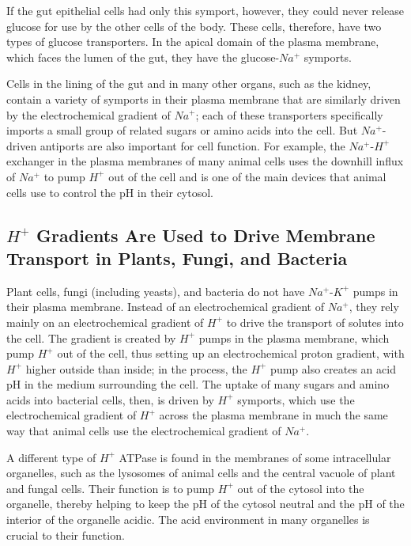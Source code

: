 If the gut epithelial cells had only this symport, however, they could never
release glucose for use by the other cells of the body. These cells, therefore,
have two types of glucose transporters. In the apical domain of the plasma
membrane, which faces the lumen of the gut, they have the glucose-$Na^{+}$
symports.

Cells in the lining of the gut and in many other organs, such as the kidney,
contain a variety of symports in their plasma membrane that are similarly
driven by the electrochemical gradient of $Na^{+}$; each of these transporters
specifically imports a small group of related sugars or amino acids into
the cell. But $Na^{+}$-driven antiports are also important for cell function. For
example, the $Na^{+}$-$H^{+}$ exchanger in the plasma membranes of many animal
cells uses the downhill influx of $Na^{+}$ to pump $H^{+}$ out of the cell and
is one of the main devices that animal cells use to control the pH in their
cytosol.

\subsection{$H^{+}$ Gradients Are Used to Drive Membrane Transport in Plants, Fungi, and Bacteria}

Plant cells, fungi (including yeasts), and bacteria do not have $Na^{+}$-$K^{+}$
pumps in their plasma membrane. Instead of an electrochemical gradient
of $Na^{+}$, they rely mainly on an electrochemical gradient of $H^{+}$ to drive the
transport of solutes into the cell. The gradient is created by $H^{+}$ pumps in
the plasma membrane, which pump $H^{+}$ out of the cell, thus setting up an
electrochemical proton gradient, with $H^{+}$ higher outside than inside; in the
process, the $H^{+}$ pump also creates an acid pH in the medium surrounding
the cell. The uptake of many sugars and amino acids into bacterial cells,
then, is driven by $H^{+}$ symports, which use the electrochemical gradient of
$H^{+}$ across the plasma membrane in much the same way that animal cells
use the electrochemical gradient of $Na^{+}$.

A different type of $H^{+}$ ATPase is found in the membranes of some intracellular
organelles, such as the lysosomes of animal cells and the central
vacuole of plant and fungal cells. Their function is to pump $H^{+}$ out of the
cytosol into the organelle, thereby helping to keep the pH of the cytosol
neutral and the pH of the interior of the organelle acidic. The acid environment
in many organelles is crucial to their function.

